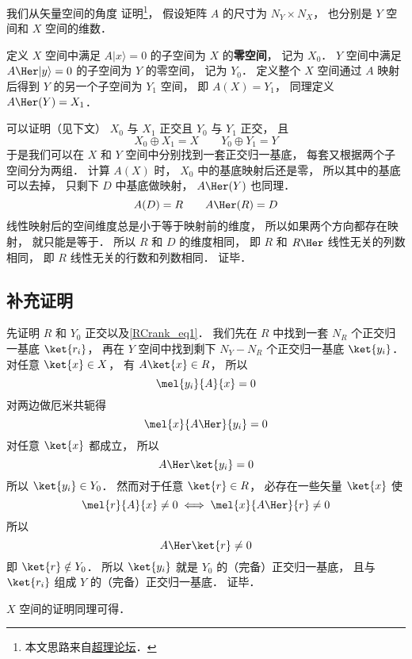 

我们从矢量空间的角度 证明\footnote{本文思路来自\href{https://chaoli.club/index.php/4821}{超理论坛}．}， 假设矩阵 $A$ 的尺寸为 $N_Y \times N_X$， 也分别是 $Y$ 空间和 $X$ 空间的维数．

定义 $X$ 空间中满足 $A |x\rangle = 0$ 的子空间为 $X$ 的\textbf{零空间}， 记为 $X_0$． $Y$ 空间中满足 $A\Her |y\rangle = 0$ 的子空间为 $Y$ 的零空间， 记为 $Y_0$． 定义整个 $X$ 空间通过 $A$ 映射后得到 $Y$ 的另一个子空间为 $Y_1$ 空间， 即 $A(X) = Y_1$， 同理定义 $A\Her(Y) = X_1$． %

可以证明（见下文） $X_0$ 与 $X_1$ 正交且 $Y_0$ 与 $Y_1$ 正交， 且
\begin{equation}\label{RCrank_eq1}
X_0 \oplus X_1 = X
\qquad
Y_0 \oplus Y_1 = Y
\end{equation}
于是我们可以在 $X$ 和 $Y$ 空间中分别找到一套正交归一基底， 每套又根据两个子空间分为两组． 计算 $A(X)$ 时， $X_0$ 中的基底映射后还是零， 所以其中的基底可以去掉， 只剩下 $D$ 中基底做映射， $A\Her(Y)$ 也同理．
\begin{equation}
A(D) = R
\qquad
A\Her(R) = D
\end{equation}
线性映射后的空间维度总是小于等于映射前的维度， 所以如果两个方向都存在映射， 就只能是等于． 所以 $R$ 和 $D$ 的维度相同， 即 $R$ 和 $R\Her$ 线性无关的列数相同， 即 $R$ 线性无关的行数和列数相同． 证毕．

\subsection{补充证明}
先证明 $R$ 和 $Y_0$ 正交以及\autoref{RCrank_eq1}． 我们先在 $R$ 中找到一套 $N_R$ 个正交归一基底 $\ket{r_i}$， 再在 $Y$ 空间中找到剩下 $N_Y - N_R$ 个正交归一基底 $\ket{y_i}$． 对任意 $\ket{x} \in X$， 有 $A \ket{x} \in R$， 所以
\begin{equation}
\mel{y_i}{A}{x} = 0
\end{equation}
对两边做厄米共轭得%
\begin{equation}
\mel{x}{A\Her}{y_i} = 0
\end{equation}
对任意 $\ket{x}$ 都成立， 所以
\begin{equation}
A\Her\ket{y_i} = 0
\end{equation}
所以 $\ket{y_i} \in Y_0$． 然而对于任意 $\ket{r} \in R$， 必存在一些矢量 $\ket{x}$ 使
\begin{equation}
\mel{r}{A}{x} \ne 0
\iff
\mel{x}{A\Her}{r} \ne 0
\end{equation}
所以
\begin{equation}
A\Her\ket{r} \ne 0
\end{equation}
即 $\ket{r} \notin Y_0$． 所以 $\ket{y_i}$ 就是 $Y_0$ 的（完备）正交归一基底， 且与 $\ket{r_i}$ 组成 $Y$ 的（完备）正交归一基底． 证毕．

$X$ 空间的证明同理可得．
